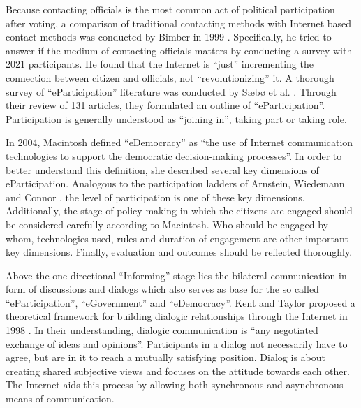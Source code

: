 Because contacting officials is the most common act of political participation after voting, a comparison of traditional contacting methods with Internet based contact methods was conducted by Bimber in 1999 \cite{Bimber1999_Citizen_communication_with_government}. Specifically, he tried to answer if the medium of contacting officials matters by conducting a survey with 2021 participants. He found that the Internet is ``just'' incrementing the connection between citizen and officials, not ``revolutionizing'' it.
A thorough survey of ``eParticipation'' literature was conducted by S{\ae}b{\o} et al. \cite{Saebo_eParticipation}. Through their review of 131 articles, they formulated an outline of ``eParticipation''. Participation is generally understood as ``joining in'', taking part or taking role. 



In 2004, Macintosh \cite{Macintosh2004_eParticipation_characterization} defined ``eDemocracy'' as ``the use of Internet communication technologies to support the democratic decision-making processes''. In order to better understand this definition, she described several key dimensions of eParticipation. Analogous to the participation ladders of Arnstein, Wiedemann and Connor \cite{Arnstein1969_citizen_participation,Wiedemann1993355,Connor1988_new_ladder}, the level of participation is one of these key dimensions. Additionally, the stage of policy-making in which the citizens are engaged should be considered carefully according to Macintosh. Who should be engaged by whom, technologies used, rules and duration of engagement are other important key dimensions. Finally, evaluation and outcomes should be reflected thoroughly.

Above the one-directional ``Informing'' stage lies the bilateral communication in form of discussions and dialogs which also serves as base for the so called ``eParticipation'', ``eGovernment'' and ``eDemocracy''. Kent and Taylor proposed a theoretical framework for building dialogic relationships through the Internet in 1998 \cite{Kent1998_dialogic_relationships_through_www}. In their understanding, dialogic communication is ``any negotiated exchange of ideas and opinions''. Participants in a dialog not necessarily have to agree, but are in it to reach a mutually satisfying position. Dialog is about creating shared subjective views and focuses on the attitude towards each other. The Internet aids this process by allowing both synchronous and asynchronous means of communication.

